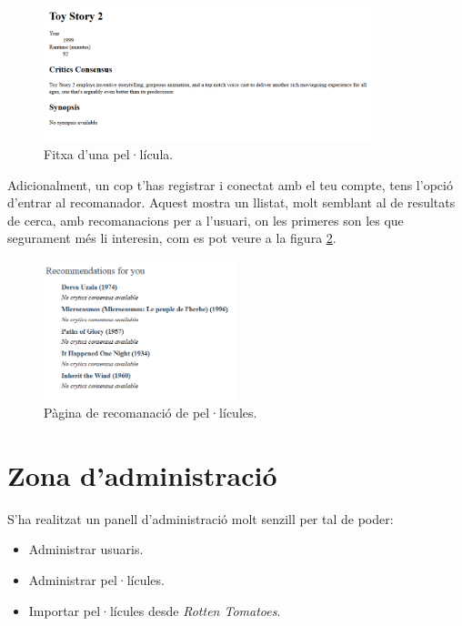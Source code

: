 \begin{figure}[h!]
  \caption{Fitxa d'una pel·lícula.}
  \label{figure-film}
  \centering
    \includegraphics[width=0.85\textwidth]{figs/film.png}
\end{figure}

Adicionalment, un cop t'has registrar i conectat amb el teu compte, tens l'opció d'entrar al recomanador. Aquest mostra un llistat, molt semblant al de resultats de cerca, amb recomanacions per a l'usuari, on les primeres son les que segurament més li interesin, com es pot veure a la figura \ref{figure-recommendations}.

\begin{figure}[h!]
  \caption{Pàgina de recomanació de pel·lícules.}
  \label{figure-recommendations}
  \centering
    \includegraphics[width=0.5\textwidth]{figs/recommendation.png}
\end{figure}

\section{Zona d'administració}

S'ha realitzat un panell d'administració molt senzill per tal de poder:

\begin{itemize}
	\item Administrar usuaris.
	\item Administrar pel·lícules.
	\item Importar pel·lícules desde \emph{Rotten Tomatoes}.
\end{itemize}

